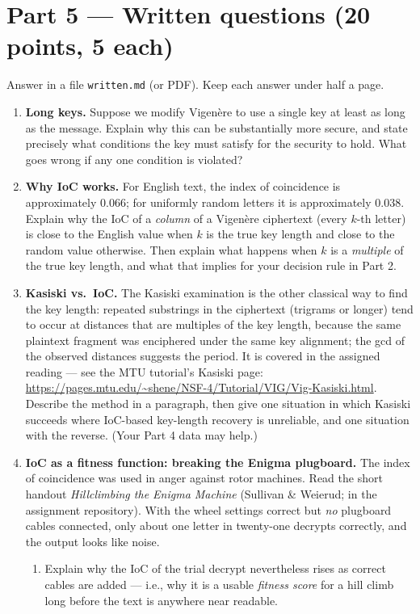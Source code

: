 \documentclass[11pt]{article}
\newcommand{\file}[1]{\texttt{#1}}
\begin{document}
\section*{Part 5 --- Written questions (20 points, 5 each)}

Answer in a file \file{written.md} (or PDF). Keep each answer under half a page.
\begin{enumerate}
\item \textbf{Long keys.} Suppose we modify Vigen\`ere to use a single key at least as long as the message. Explain why this can be substantially more secure, and state precisely what conditions the key must satisfy for the security to hold. What goes wrong if any one condition is violated?
\item \textbf{Why IoC works.} For English text, the index of coincidence is approximately 0.066; for uniformly random letters it is approximately 0.038. Explain why the IoC of a \emph{column} of a Vigen\`ere ciphertext (every $k$-th letter) is close to the English value when $k$ is the true key length and close to the random value otherwise. Then explain what happens when $k$ is a \emph{multiple} of the true key length, and what that implies for your decision rule in Part 2.
\item \textbf{Kasiski vs.\ IoC.} The Kasiski examination is the other classical way to find the key length: repeated substrings in the ciphertext (trigrams or longer) tend to occur at distances that are multiples of the key length, because the same plaintext fragment was enciphered under the same key alignment; the gcd of the observed distances suggests the period. It is covered in the assigned reading --- see the MTU tutorial's Kasiski page: \url{https://pages.mtu.edu/~shene/NSF-4/Tutorial/VIG/Vig-Kasiski.html}. Describe the method in a paragraph, then give one situation in which Kasiski succeeds where IoC-based key-length recovery is unreliable, and one situation with the reverse. (Your Part 4 data may help.)
\item \textbf{IoC as a fitness function: breaking the Enigma plugboard.} The index of coincidence was used in anger against rotor machines. Read the short handout \emph{Hillclimbing the Enigma Machine} (Sullivan \& Weierud; in the assignment repository). With the wheel settings correct but \emph{no} plugboard cables connected, only about one letter in twenty-one decrypts correctly, and the output looks like noise.
  \begin{enumerate}[label=(\alph*)]
  \item Explain why the IoC of the trial decrypt nevertheless rises as correct cables are added --- i.e., why it is a usable \emph{fitness score} for a hill climb long before the text is anywhere near readable.

\end{enumerate}
\end{enumerate}
\end{document}
